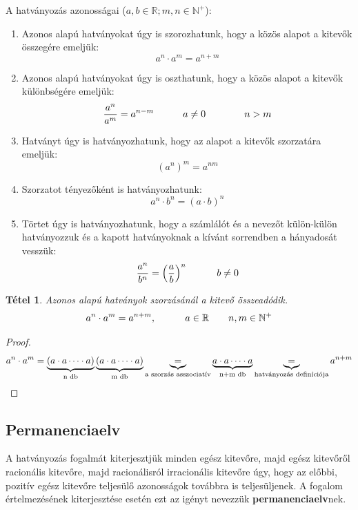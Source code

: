 \documentclass[12pt,a4paper]{article}
\newtheorem{theorem}{Tétel} [section]
\begin{document}
A hatványozás azonosságai ($a,b\in \mathbb{R}; m,n\in \mathbb{N}^+$):
\begin{enumerate}[label=\Roman*.]
\item Azonos alapú hatványokat úgy is szorozhatunk, hogy a közös alapot a kitevők összegére emeljük:
$$a^n \cdot a^m = a^{n+m}$$
\item Azonos alapú hatványokat úgy is oszthatunk, hogy a közös alapot a kitevők különbségére emeljük:
$$\dfrac{a^n}{a^m} = a^{n-m} \hspace{30px} a \neq 0 \hspace{20px} \hspace{20px} n > m$$
\item Hatványt úgy is hatványozhatunk, hogy az alapot a kitevők szorzatára emeljük:
$$\left(a^n\right)^m = a^{nm}$$
\item Szorzatot tényezőként is hatványozhatunk:
$$a^n \cdot b^n = (a\cdot b)^n$$
\item  Törtet úgy is hatványozhatunk, hogy a számlálót és a nevezőt külön-külön hatványozzuk és a kapott hatványoknak a kívánt sorrendben a hányadosát vesszük:
$$\dfrac{a^n}{b^n} = \left( \dfrac{a}{b} \right)^n \hspace{30px} b \neq 0$$
\end{enumerate}
\begin{theorem}
Azonos alapú hatványok szorzásánál a kitevő összeadódik. \\
$$a^n \cdot a^m = a^{n+m}, \hspace{30px} a \in \mathbb{R} \hspace{20px} n,m\in \mathbb{N}^+$$
\end{theorem}
\begin{proof}
\[a^n \cdot a^m = \underbrace{(a\cdot a\cdots \cdot a)}_{\text{\normalfont n db}} \underbrace{(a\cdot a\cdots \cdot a)}_{\text{\normalfont m db}}
\underbrace{=}_{\text{\normalfont a szorzás asszociatív}} \underbrace{a\cdot a\cdots \cdot a}_{\text{n+m db}} \underbrace{=}_{\text{\normalfont hatványozás definíciója}} a ^ {n+m}\]
\end{proof}

\subsection{Permanenciaelv}
A hatványozás fogalmát kiterjesztjük minden egész kitevőre, majd egész kitevőről racionális kitevőre, majd racionálisról irracionális kitevőre úgy, hogy az előbbi, pozitív egész kitevőre teljesülő azonosságok továbbra is teljesüljenek. A fogalom értelmezésének kiterjesztése esetén ezt az igényt nevezzük \textbf{permanenciaelv}nek.
\end{document}
